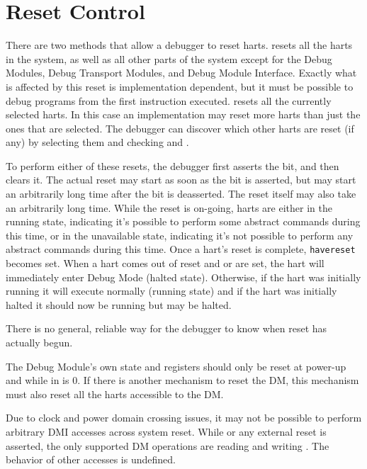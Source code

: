 \section{Reset Control} \label{reset}

There are two methods that allow a debugger to reset harts.
\FdmDmcontrolNdmreset resets all the harts in the system, as well as all other
parts of the system except for the Debug Modules, Debug Transport Modules,
and Debug Module Interface.
Exactly what is affected by this reset is implementation dependent, but it
must be possible to debug programs from the first instruction executed.
\FdmDmcontrolHartreset resets all the currently selected harts. In this case an
implementation may reset more harts than just the ones that are selected. The
debugger can discover which other harts are reset (if any) by selecting them
and checking \FdmDmstatusAnyhavereset and \FdmDmstatusAllhavereset.

To perform either of these resets, the debugger first asserts the bit, and then
clears it. The actual reset may start as soon as the bit is asserted, but may
start an arbitrarily long time after the bit is deasserted. The reset itself
may also take an arbitrarily long time.  While the reset is
on-going, harts are either in the running state, indicating it's possible to
perform some abstract commands during this time, or in the unavailable state,
indicating it's not possible to perform any abstract commands during this time.
Once a hart's reset is complete, {\tt havereset} becomes set.  When a hart comes out
of reset and \FdmDmcontrolHaltreq or \Fresethaltreq are set, the hart will
immediately enter Debug Mode (halted state).
Otherwise, if the hart was initially running it will execute normally (running state)
and if the hart was initially halted it should now be running but may be halted.

\begin{commentary}
    There is no general, reliable way for the debugger to know when reset has
    actually begun.
\end{commentary}

The Debug Module's own state and registers should only be
reset at power-up and while
\FdmDmcontrolDmactive in \RdmDmcontrol is 0. If there is another mechanism to
reset the DM, this mechanism must also reset all the harts accessible to the
DM.

Due to clock and power domain crossing issues,
it may not be possible to perform arbitrary DMI accesses across
system reset.
While \FdmDmcontrolNdmreset or any external reset is asserted, the only supported DM
operations are reading and writing \RdmDmcontrol. The behavior of other accesses
is undefined.

